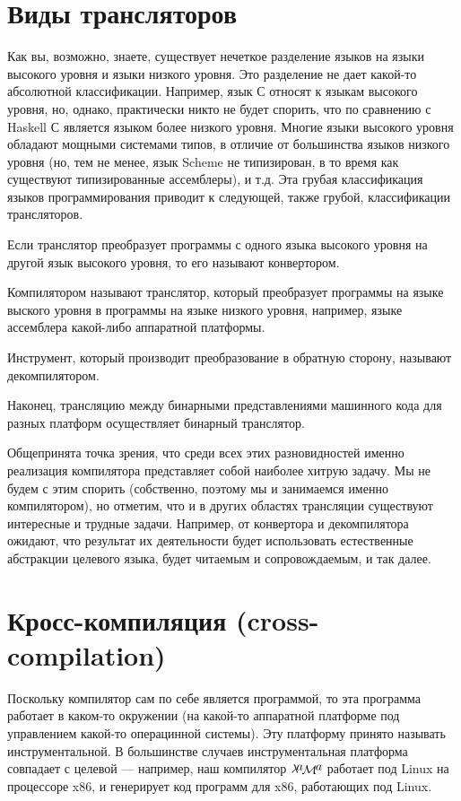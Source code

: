 \documentclass{article}
\newcommand{\lama}{$\lambda\kern -.1667em\lower -.5ex\hbox{$a$}\kern -.1000em\lower .2ex\hbox{$\mathcal M$}\kern -.1000em\lower -.5ex\hbox{$a$}$\xspace}
\begin{document}
\section{Виды трансляторов}

Как вы, возможно, знаете, существует нечеткое разделение языков на языки высокого уровня и языки низкого уровня. Это разделение не дает какой-то абсолютной
классификации. Например, язык С относят к языкам высокого уровня, но, однако, практически никто не будет спорить, что по сравнению с Haskell С является
языком более низкого уровня. Многие языки высокого уровня обладают мощными системами типов, в отличие от большинства языков низкого уровня (но, тем не менее,
язык Scheme не типизирован, в то время как существуют типизированные ассемблеры), и т.д. Эта грубая классификация языков программирования приводит к следующей,
также грубой, классификации трансляторов.

Если транслятор преобразует программы с одного языка высокого уровня на другой язык высокого уровня, то его называют конвертором.

Компилятором называют транслятор, который преобразует программы на языке выского уровня в программы на языке низкого уровня, например, языке ассемблера
какой-либо аппаратной платформы.

Инструмент, который производит преобразование в обратную сторону, называют декомпилятором.

Наконец, трансляцию между бинарными представлениями машинного кода для разных платформ осуществляет бинарный транслятор.

Общепринята точка зрения, что среди всех этих разновидностей именно реализация компилятора представляет собой наиболее хитрую задачу. Мы
не будем с этим спорить (собственно, поэтому мы и занимаемся именно компилятором), но отметим, что и в других областях трансляции
существуют интересные и трудные задачи. Например, от конвертора и декомпилятора ожидают, что результат их деятельности будет использовать
естественные абстракции целевого языка, будет читаемым и сопровождаемым, и так далее.

\section{Кросс-компиляция (cross-compilation)}

Поскольку компилятор сам по себе является программой, то эта программа работает в каком-то окружении (на какой-то аппаратной платформе
под управлением какой-то операцинной системы). Эту платформу принято называть инструментальной. В большинстве случаев
инструментальная платформа совпадает с целевой --- например, наш компилятор \lama работает под Linux на процессоре x86, и генерирует
код программ для x86, работающих под Linux.
\end{document}
